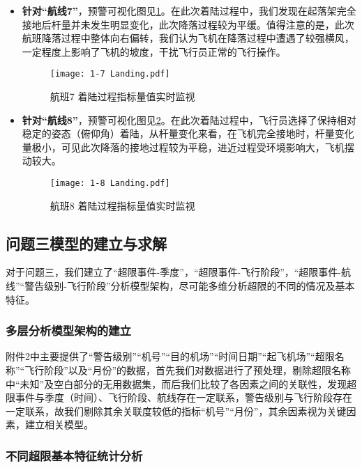 \documentclass{MathorCupModeling}
\begin{document}
\begin{itemize}
		\item \textbf{针对“航线7”}，预警可视化图见\textcolor{blue}{\cref{fig:1-7}}。在此次着陆过程中，我们发现在起落架完全接地后杆量并未发生明显变化，此次降落过程较为平缓。值得注意的是，此次航班降落过程中整体向右偏转，我们认为飞机在降落过程中遭遇了较强横风，一定程度上影响了飞机的坡度，干扰飞行员正常的飞行操作。
		\begin{figure}[H]
			\centering
			\texttt{[image: 1-7 Landing.pdf]}
			\caption{航班7 着陆过程指标量值实时监视}
			\label{fig:1-7}
		\end{figure}
		\item \textbf{针对“航线8”}，预警可视化图见\textcolor{blue}{\cref{fig:1-8}}。在此次着陆过程中，飞行员选择了保持相对稳定的姿态（俯仰角）着陆，从杆量变化来看，在飞机完全接地时，杆量变化量极小，可见此次降落的接地过程较为平稳，进近过程受环境影响大，飞机摆动较大。
		\begin{figure}[H]
			\centering
			\texttt{[image: 1-8 Landing.pdf]}
			\caption{航班8 着陆过程指标量值实时监视}
			\label{fig:1-8}
		\end{figure}
	\end{itemize}


	\subsection{问题三模型的建立与求解}
	对于问题三，我们建立了“超限事件-季度”，“超限事件-飞行阶段”，“超限事件-航线”“警告级别-飞行阶段”分析模型架构，尽可能多维分析超限的不同的情况及基本特征。
	\subsubsection{多层分析模型架构的建立}
	附件2中主要提供了“警告级别”“机号”“目的机场”“时间日期”“起飞机场”“超限名称”“飞行阶段”以及“月份”的数据，首先我们对数据进行了预处理，剔除超限名称中“未知”及空白部分的无用数据集，而后我们比较了各因素之间的关联性，发现超限事件与季度（时间）、飞行阶段、航线存在一定联系，警告级别与飞行阶段存在一定联系，故我们剔除其余关联度较低的指标“机号”“月份”，其余因素视为关键因素，建立相关模型。
	\subsubsection{不同超限基本特征统计分析}
	
\end{document}
